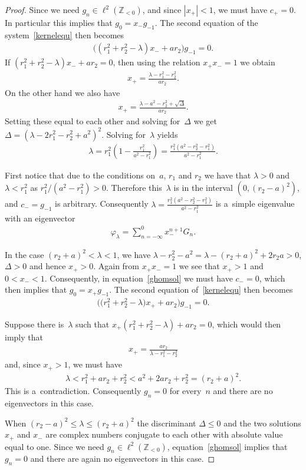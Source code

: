 \begin{proof}
Since we need $g_n\in\ell^2({\mathbb Z}_{<0})$, and since $|x_+|<1$, we must have $c_+=0$.
In particular this implies that $g_0=x_-g_{-1}$.
The second equation of the system~\eqref{kernelequ} then becomes
\begin{gather*}
\big((r_1^2+r_2^2-\lambda)x_-+ar_2\big)g_{-1} =0.
\end{gather*}
If $(r_1^2+ r_2^2-\lambda)x_-+ar_2=0$, then using the relation $x_+x_- =1$ we obtain
\begin{gather*}
x_+=\frac{\lambda-r_1^2-r_2^2}{ar_2}.
\end{gather*}
On the other hand we also have
\begin{gather*}
x_+=\frac{\lambda-a^2-r_2^2+\sqrt{\Delta}}{ar_2}.
\end{gather*}
Setting these equal to each other and solving for~$\Delta$ we get $\Delta=(\lambda-2r_1^2-r_2^2+a^2)^2$.
Solving for~$\lambda$ yields
\begin{gather*}
\lambda=r_1^2\left(1-\frac{r_1^2}{a^2- r_1^2}\right)=\frac{r_1^2(a^2-r_2^2-r_1^2)}{a^2-r_1^2}.
\end{gather*}

First notice that due to the conditions on~$a$, $r_1$ and $r_2$ we have that $\lambda>0$ and $\lambda <r_1^2$ as
$r_1^2/(a^2-r_1^2)>0$.
Therefore this~$\lambda$ is in the interval $(0,(r_2-a)^2)$, and $c_-=g_{-1}$ is arbitrary.
Consequently $\lambda =\frac{r_1^2(a^2-r_2^2-r_1^2)}{a^2-r_1^2}$ is a~simple eigenvalue with an eigenvector
\begin{gather*}
\varphi_\lambda=\sum\limits_{n=-\infty}^0x_-^{n+1}G_n.
\end{gather*}

In the case $(r_2+a)^2<\lambda<1$, we have $\lambda-r_2^2-a^2=\lambda-(r_2+a)^2+2r_2a>0$, $\Delta>0$ and hence $x_+>0$.
Again from $x_+x_-=1$ we see that $x_+>1$ and $0<x_-<1$.
Consequently, in equation~\eqref{ghomsol} we must have $c_-=0$, which then implies that $g_0=x_+g_{-1}$.
The second equation of~\eqref{kernelequ} then becomes
\begin{gather*}
\big(\big(r_1^2+r_2^2-\lambda\big)x_++ar_2\big)g_{-1} =0.
\end{gather*}

Suppose there is~$\lambda$ such that $x_+(r_1^2+ r_2^2-\lambda)+ar_2=0$, which would then imply that
\begin{gather*}
x_+=\frac{ar_2}{\lambda-r_1^2-r_2^2}
\end{gather*}
and, since $x_+>1$, we must have
\begin{gather*}
\lambda < r_1^2+ar_2+r_2^2 < a^2+2ar_2+r_2^2=(r_2+a)^2.
\end{gather*}
This is a~contradiction.
Consequently $g_{n}=0$ for every~$n$ and there are no eigenvectors in this case.

When $(r_2-a)^2\leq\lambda\leq (r_2+a)^2$ the discriminant $\Delta\leq 0$ and the two solutions $x_+$ and $x_-$ are
complex numbers conjugate to each other with absolute value equal to one.
Since we need $g_n\in\ell^2({\mathbb Z}_{<0})$, equation~\eqref{ghomsol} implies that $g_{n}=0$ and there are again no
eigenvectors in this case.
\end{proof}

